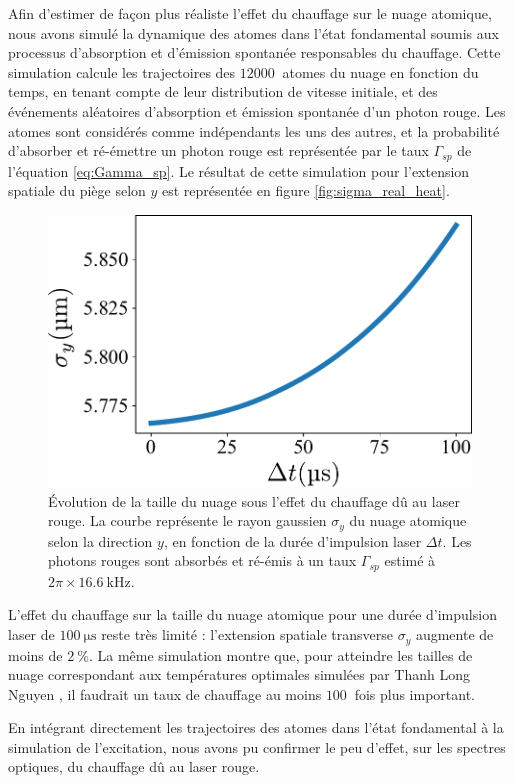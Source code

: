 Afin d'estimer de façon plus réaliste l'effet du chauffage sur le nuage atomique, nous avons simulé la dynamique des atomes dans l'état fondamental soumis aux processus d'absorption et d'émission spontanée responsables du chauffage.
Cette simulation calcule les trajectoires des $\SI{12000}{}$ atomes du nuage en fonction du temps, en tenant compte de leur distribution de vitesse initiale, et des événements aléatoires d'absorption et émission spontanée d'un photon rouge.
Les atomes sont considérés comme indépendants les uns des autres, et la probabilité d'absorber et ré-émettre un photon rouge est représentée par le taux $\Gamma_{sp}$ de l'équation \eqref{eq:Gamma_sp}.
Le résultat de cette simulation pour l'extension spatiale du piège selon $y$ est représentée en figure \eqref{fig:sigma_real_heat}.
%
\begin{figure}[h]
\centering
\includegraphics[width=0.6\linewidth]{figures/low_l/sigmaytime}
\caption[Évolution de la taille du nuage sous l'effet du chauffage dû au laser rouge]{
Évolution de la taille du nuage sous l'effet du chauffage dû au laser rouge.
La courbe représente le rayon gaussien $\sigma_y$ du nuage atomique selon la direction $y$, en fonction de la durée d'impulsion laser $\Delta t$.
Les photons rouges sont absorbés et ré-émis à un taux $\Gamma_{sp}$ estimé à $2\pi\times\SI{16.6}{\kHz}$.
}
\label{fig:sigma_real_heat}
\end{figure}
%
L'effet du chauffage sur la taille du nuage atomique pour une durée d'impulsion laser de $\SI{100}{\us}$ reste très limité : l'extension spatiale transverse $\sigma_y$ augmente de moins de $\SI{2}{\percent}$.
La même simulation montre que, pour atteindre les tailles de nuage correspondant aux températures optimales simulées par Thanh Long Nguyen \cite{PHD_NGUYEN}, il faudrait un taux de chauffage au moins $\SI{100}{}$ fois plus important.

En intégrant directement les trajectoires des atomes dans l'état fondamental à la simulation de l'excitation, nous avons pu confirmer le peu d'effet, sur les spectres optiques, du chauffage dû au laser rouge.

